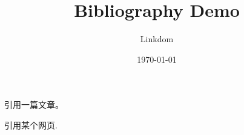 \documentclass{article}
\title{Bibliography Demo}
\author{Linkdom}
\date{\today}
\begin{document}
\maketitle

引用一篇文章\cite{greenwade93}。

引用某个网页\cite{latex_wiki}.




\end{document}
